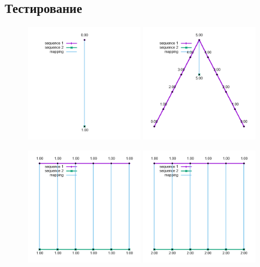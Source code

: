 \documentclass[12pt]{article}
\begin{document}
\subsection{Тестирование}

\begin{figure}[h]
    \centering
    \includegraphics[width=0.45\textwidth, height=0.45\textwidth]{tests/one_to_one}
    \includegraphics[width=0.45\textwidth, height=0.45\textwidth]{tests/one_to_all}
\end{figure}

\newpage

\begin{figure}[h]
    \centering
    \includegraphics[width=0.45\textwidth, height=0.45\textwidth]{tests/constants}
    \includegraphics[width=0.45\textwidth, height=0.45\textwidth]{tests/diff_constants}
\end{figure}
\end{document}

